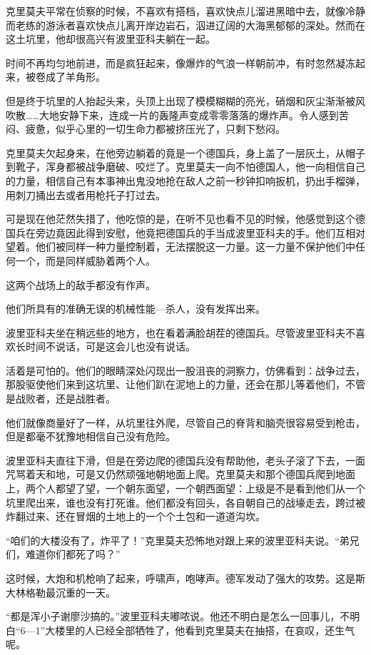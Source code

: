 克里莫夫平常在侦察的时候，不喜欢有搭档，喜欢快点儿溜进黑暗中去，就像冷静而老练的游泳者喜欢快点儿离开岸边岩石，泅进辽阔的大海黑郁郁的深处。然而在这土坑里，他却很高兴有波里亚科夫躺在一起。

时间不再均匀地前进，而是疯狂起来，像爆炸的气浪一样朝前冲，有时忽然凝冻起来，被卷成了羊角形。

但是终于坑里的人抬起头来，头顶上出现了模模糊糊的亮光，硝烟和灰尘渐渐被风吹散……大地安静下来，连成一片的轰隆声变成零零落落的爆炸声。令人感到苦闷、疲惫，似乎心里的一切生命力都被挤压光了，只剩下愁闷。

克里莫夫欠起身来，在他旁边躺着的竟是一个德国兵，身上盖了一层灰土，从帽子到靴子，浑身都被战争磨破、咬烂了。克里莫夫一向不怕德国人，他一向相信自己的力量，相信自己有本事神出鬼没地抢在敌人之前一秒钟扣响扳机，扔出手榴弹，用刺刀捅出去或者用枪托子打过去。

可是现在他茫然失措了，他吃惊的是，在听不见也看不见的时候，他感觉到这个德国兵在旁边竟因此得到安慰，他竟把德国兵的手当成波里亚科夫的手。他们互相对望着。他们被同样一种力量控制着，无法摆脱这一力量。这一力量不保护他们中任何一个，而是同样威胁着两个人。

这两个战场上的敌手都没有作声。

他们所具有的准确无误的机械性能—杀人，没有发挥出来。

波里亚科夫坐在稍远些的地方，也在看着满脸胡茬的德国兵。尽管波里亚科夫不喜欢长时间不说话，可是这会儿也没有说话。

活着是可怕的。他们的眼睛深处闪现出一股沮丧的洞察力，仿佛看到：战争过去，那股驱使他们来到这坑里、让他们趴在泥地上的力量，还会在那儿等着他们，不管是战败者，还是战胜者。

他们就像商量好了一样，从坑里往外爬，尽管自己的脊背和脑壳很容易受到枪击，但是都毫不犹豫地相信自己没有危险。

波里亚科夫直往下滑，但是在旁边爬的德国兵没有帮助他，老头子滚了下去，一面咒骂着天和地，可是又仍然顽强地朝地面上爬。克里莫夫和那个德国兵爬到地面上，两个人都望了望，一个朝东面望，一个朝西面望：上级是不是看到他们从一个坑里爬出来，谁也没有打死谁。他们都没有回头，各自朝自己的战壕走去，跨过被炸翻过来、还在冒烟的土地上的一个个土包和一道道沟坎。

“咱们的大楼没有了，炸平了！”克里莫夫恐怖地对跟上来的波里亚科夫说。“弟兄们，难道你们都死了吗？”

这时候，大炮和机枪响了起来，呼啸声，咆哮声。德军发动了强大的攻势。这是斯大林格勒最沉重的一天。

“都是浑小子谢廖沙搞的。”波里亚科夫嘟哝说。他还不明白是怎么一回事儿，不明白“6—1”大楼里的人已经全部牺牲了，他看到克里莫夫在抽搭，在哀叹，还生气呢。


